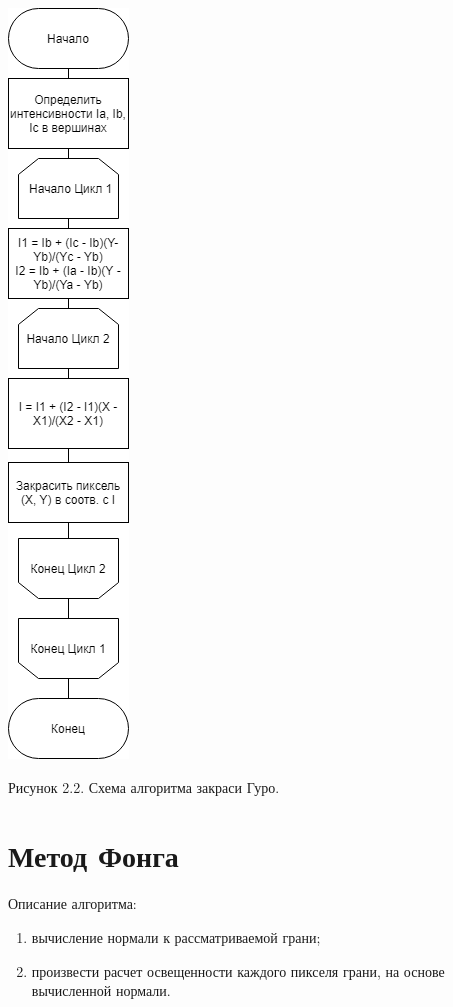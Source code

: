 \documentclass[12pt]{report}
\begin{document}
	\begin{center}
		\includegraphics[scale=0.6]{gourandBS.png}
		
		Рисунок 2.2. Схема алгоритма закраси Гуро.
	\end{center}
	
	\section{Метод Фонга}
	
	Описание алгоритма:
	\begin{enumerate}
		\item вычисление нормали к рассматриваемой грани;
		\item произвести расчет освещенности каждого пикселя грани, на основе вычисленной нормали.
	\end{enumerate}
\end{document}
